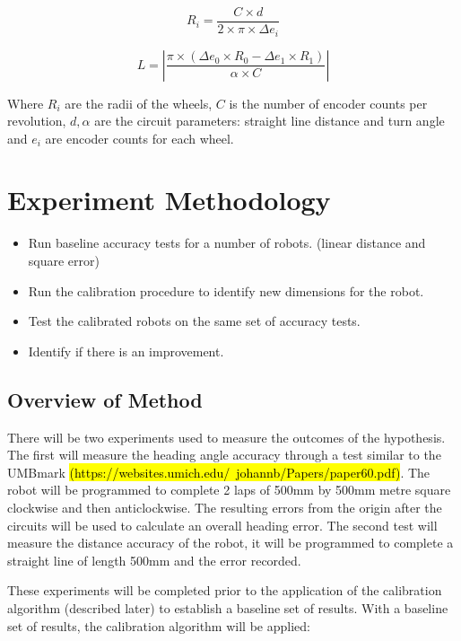 \documentclass[conference]{IEEEtran}
\begin{document}
\begin{equation}
\label{eq:linear}
    R_i = \frac{C \times d}{2 \times \pi \times \Delta e_i}
\end{equation}


\begin{equation}
L = \left|\frac{\pi \times (\Delta e_0 \times R_0 - \Delta e_1 \times R_1)}{\alpha \times C}\right|
\end{equation}

Where $R_i$ are the radii of the wheels, $C$ is the number of encoder counts per revolution, $d,\alpha$ are the circuit parameters: straight line distance and turn angle and $e_i$ are encoder counts for each wheel.




\section{Experiment Methodology}\label{sec:experiment_method}


\begin{itemize}
    \item Run baseline accuracy tests for a number of robots. (linear distance and square error)
    \item Run the calibration procedure to identify new dimensions for the robot.
    \item Test the calibrated robots on the same set of accuracy tests.
    \item Identify if there is an improvement.

\end{itemize}

\subsection{Overview of Method}


There will be two experiments used to measure the outcomes of the hypothesis. The first will measure the heading angle accuracy through a test similar to the UMBmark \hl{(https://websites.umich.edu/~johannb/Papers/paper60.pdf)}. The robot will be programmed to complete 2 laps of 500mm by 500mm metre square clockwise and then anticlockwise. The resulting errors from the origin after the circuits will be used to calculate an overall heading error. The second test will measure the distance accuracy of the robot, it will be programmed to complete a straight line of length 500mm and the error recorded.

These experiments will be completed prior to the application of the calibration algorithm (described later) to establish a baseline set of results. With a baseline set of results, the calibration algorithm will be applied:
\end{document}
